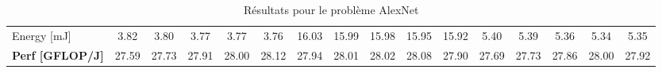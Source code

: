 \documentclass[10pt,letterpaper]{article}
\begin{document}
\begin{table}
\begin{tabular}{l|ccccc|ccccc|ccccc}
        Energy {[}mJ{]}             & 3.82             & 3.80             & 3.77            & 3.77           & 3.76           & 16.03            & 15.99           & 15.98           & 15.95          & 15.92          & 5.40             & 5.39             & 5.36            & 5.34           & 5.35           \\
        \textbf{Perf {[}GFLOP/J{]}} & 27.59            & 27.73            & 27.91           & 28.00          & 28.12          & 27.94            & 28.01           & 28.02           & 28.08          & 27.90          & 27.69            & 27.73            & 27.86           & 28.00          & 27.92         
        \end{tabular}
        \caption{Résultats pour le problème AlexNet}
        \label{fig:results_alex}
        
    \bigskip
    \bigskip
    \bigskip
    \bigskip


\end{table}
\end{document}

